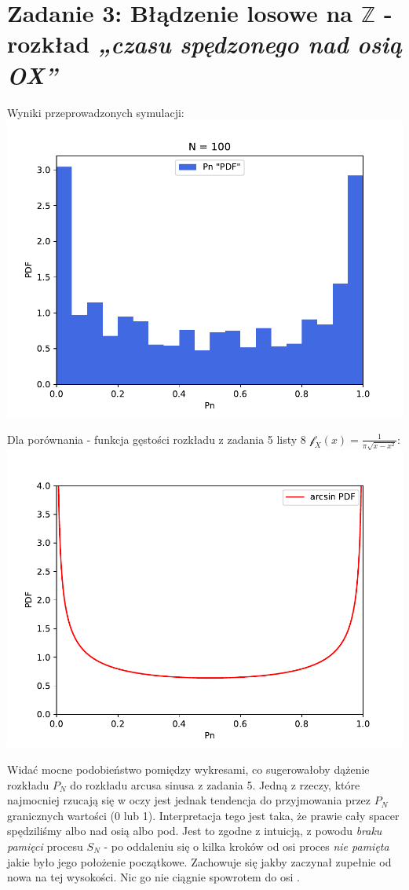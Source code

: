 \documentclass{article}
\begin{document}
\section*{Zadanie 3: Błądzenie losowe na \(\mathbb{Z}\) - rozkład \textit{„czasu spędzonego nad osią OX”}}

Wyniki przeprowadzonych symulacji:\\
\hspace*{-0cm} \includegraphics[scale=0.5]{./plots/exc3.pdf}

Dla porównania - funkcja gęstości rozkładu z zadania 5 listy 8 \( \mathcal{f}_X\left(x\right) = \frac{1}{\pi\sqrt{x - x^2}} \):\\
\hspace*{-0cm} \includegraphics[scale=0.5]{./plots/exc3-arcsin.pdf}

Widać mocne podobieństwo pomiędzy wykresami, co sugerowałoby dążenie rozkładu \( P_N \) do rozkładu arcusa sinusa z zadania 5.
Jedną z rzeczy, które najmocniej rzucają się w oczy jest jednak tendencja do przyjmowania przez \( P_N \) granicznych wartości (0 lub 1).
Interpretacja tego jest taka, że prawie cały spacer spędziliśmy albo nad osią  albo pod.
Jest to zgodne z intuicją, z powodu \textit{braku pamięci} procesu \( S_N \) - po oddaleniu się o kilka kroków od osi  
proces \textit{nie pamięta} jakie było jego położenie początkowe. Zachowuje się jakby zaczynał zupełnie od nowa na tej wysokości.
Nic go nie ciągnie spowrotem do osi .
\end{document}
